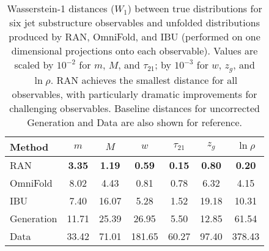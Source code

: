 \begin{table}
    \centering
    \def\arraystretch{1.5}
    \begin{tabular}{lcccccc}
        \toprule
        Method & $m$ & $M$ & $w$ & $\tau_{21}$ & $z_g$ & $\ln\rho$ \\
        \midrule
        RAN      & \textbf{3.35} & \textbf{1.19} & \textbf{0.59} & \textbf{0.15} & \textbf{0.80} & \textbf{0.20} \\
        OmniFold & 8.02 & 4.43 & 0.81 & 0.78 & 6.32 & 4.15 \\
        IBU      & 7.40 & 16.07 & 5.28 & 1.52 & 19.18 & 10.31 \\
        \midrule
        Generation & 11.71 & 25.39 & 26.95 & 5.50 & 12.85 & 61.54 \\
        Data       & 33.42 & 71.01 & 181.65 & 60.27 & 97.40 & 378.43 \\
        \bottomrule
    \end{tabular}
    \caption[Wasserstein distances between unfolded and true distributions]{Wasserstein-1 distances ($W_1$) between true distributions for six jet substructure observables and unfolded distributions produced by RAN, OmniFold, and IBU (performed on one dimensional projections onto each observable).
    Values are scaled by $10^{-2}$ for $m$, $M$, and $\tau_{21}$; by $10^{-3}$ for $w$, $z_g$, and $\ln\rho$. 
    RAN achieves the smallest distance for all observables, with particularly dramatic improvements for challenging observables.
    Baseline distances for uncorrected Generation and Data are also shown for reference.}
    \label{tab:comp-w}
\end{table}
